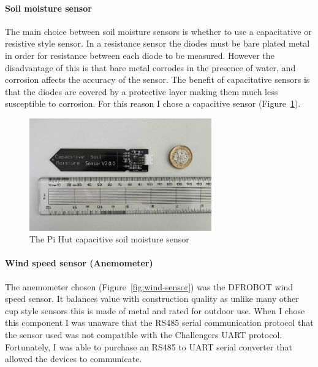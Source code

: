 \paragraph{Soil moisture sensor}

The main choice between soil moisture sensors is whether to use a capacitative
or resistive style sensor. In a resistance sensor the diodes must be bare plated
metal in order for resistance between each diode to be measured. However the
disadvantage of this is that bare metal corrodes in the presence of water, and
corrosion affects the accuracy of the sensor.  The benefit of capacitative
sensors is that the diodes are covered by a protective layer making them much
less susceptible to corrosion. For this reason I chose a capacitive sensor
(Figure~\ref{fig:soil-sensor}).


\begin{figure}[H]
    \centering
    \includegraphics[width=0.7\textwidth]{contents/part-2/fig2/soil-sensor.jpg}
    \caption{The Pi Hut capacitive soil moisture sensor}
    \label{fig:soil-sensor}
\end{figure}

\paragraph{Wind speed sensor (Anemometer)}\label{sec:anemometer}

The anemometer chosen (Figure~\ref{fig:wind-sensor}) was the DFROBOT wind speed
sensor. It balances value with construction quality as unlike many other cup
style sensors this is made of metal and rated for outdoor use. When I chose this
component I was unaware that the RS485 serial communication protocol that the
sensor used was not compatible with the Challengers UART protocol. Fortunately,
I was able to purchase an RS485 to UART serial converter that allowed the
devices to communicate.

